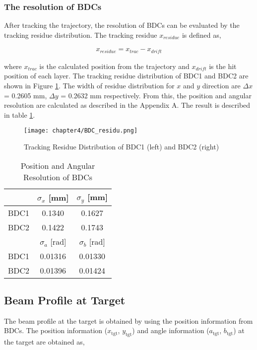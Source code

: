 \subsubsection{The resolution of BDCs}
After tracking the trajectory, the resolution of BDCs can be evaluated by the tracking residue distribution. The tracking residue $x_{residue}$ is defined as,

\begin{align}
    x_{residue} = x_{trac} - x_{drift}
\end{align}

where $x_{trac}$ is the calculated position from the trajectory and $x_{drift}$ is the hit position of each layer. The tracking residue distribution of BDC1 and BDC2 are shown in Figure \ref{fig:residue_bdcs}. The width of residue distribution for $x$ and $y$ direction are $\Delta x$ = 0.2605 mm, $\Delta y$ = 0.2632 mm respectively. From this, the position and angular resolution are calculated as described in the Appendix A. The result is described in table \ref{tab:resolution_bdcs}.

\begin{figure}
    \centering
    \texttt{[image: chapter4/BDC\_residu.png]}
    \caption[Tracking Residue Distribution of BDCs]{Tracking Residue Distribution of BDC1 (left) and BDC2 (right)}
    \label{fig:residue_bdcs}
\end{figure}

\begin{table}
    \centering
    \begin{tabular}{c|cc}
    \hline
     & $\sigma_x$ [mm] & $\sigma_y$ [mm]\\
    \hline
    BDC1 & 0.1340 & 0.1627 \\
    BDC2 & 0.1422 & 0.1743 \\
    \hline 
    \hline
    & $\sigma_a$ [rad] & $\sigma_b$ [rad]\\
    \hline
    BDC1 & 0.01316 & 0.01330 \\
    BDC2 & 0.01396 & 0.01424 \\
    \hline
    \end{tabular}
    \caption{Position and Angular Resolution of BDCs}
    \label{tab:resolution_bdcs}
\end{table}

\clearpage

\subsection{Beam Profile at Target}
The beam profile at the target is obtained by using the position information from BDCs. The position information ($x_{\text{tgt}}$, $y_{\text{tgt}}$) and angle information ($a_{\text{tgt}}$, $b_{\text{tgt}}$) at the target are obtained as,

